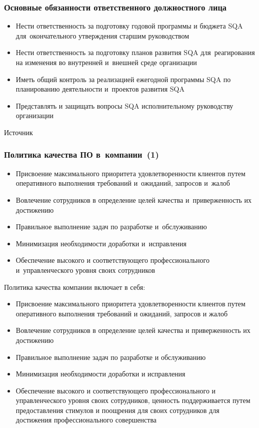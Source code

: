\documentclass{../industrial-development}
\begin{document}
\begin{frame} \frametitle{Основные обязанности ответственного должностного лица}
 	 \begin{itemize}
\item Нести ответственность за подготовку годовой программы и бюджета SQA для~окончательного утверждения старшим руководством
\item Нести ответственность за подготовку планов развития SQA для~реагирования на изменения во внутренней и~внешней среде организации
\item Иметь общий контроль за реализацией ежегодной программы SQA по планированию деятельности и~проектов развития SQA
\item Представлять и защищать вопросы SQA исполнительному руководству организации
  	\end{itemize}
\end{frame}

\lecturenotes

Источник~\cite[с.~552]{SQA-Galin}



\begin{frame} \frametitle{Политика качества ПО в~компании~(1)}
	\begin{itemize}
\item Присвоение максимального приоритета удовлетворенности клиентов путем оперативного выполнения требований и~ожиданий, запросов и~жалоб
\item Вовлечение сотрудников в определение целей качества и~приверженность их достижению
\item Правильное выполнение задач по разработке и~обслуживанию 
\item Минимизация необходимости доработки и~исправления
\item Обеспечение высокого и соответствующего профессионального и~управленческого уровня своих сотрудников
  	\end{itemize}
\end{frame}

\lecturenotes

Политика качества компании включает в себя:
	\begin{itemize}
\item Присвоение максимального приоритета удовлетворенности клиентов путем оперативного выполнения требований и ожиданий, запросов и жалоб
\item Вовлечение сотрудников в определение целей качества и приверженность их достижению
\item Правильное выполнение задач по разработке и обслуживанию 
\item Минимизация необходимости доработки и исправления
\item Обеспечение высокого и соответствующего профессионального и управленческого уровня своих сотрудников, ценность поддерживается путем предоставления стимулов и поощрения для своих сотрудников для достижения профессионального совершенства
  	\end{itemize}
\end{document}
